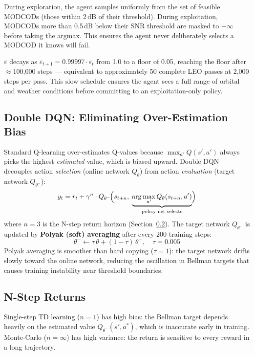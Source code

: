 \documentclass[12pt,a4paper]{report}
\begin{document}
During exploration, the agent samples uniformly from the set of feasible
MODCODs (those within 2\,dB of their threshold). During exploitation, MODCODs
more than 0.5\,dB below their SNR threshold are masked to $-\infty$ before
taking the argmax. This ensures the agent never deliberately selects a MODCOD
it knows will fail.

$\varepsilon$ decays as $\varepsilon_{t+1} = 0.99997\cdot\varepsilon_t$ from
1.0 to a floor of 0.05, reaching the floor after $\approx$100,000 steps
--- equivalent to approximately 50 complete LEO passes at 2,000 steps per pass.
This slow schedule ensures the agent sees a full range of orbital and weather
conditions before committing to an exploitation-only policy.

\subsection{Double DQN: Eliminating Over-Estimation Bias}

Standard Q-learning over-estimates Q-values because $\max_{a'} Q(s', a')$
always picks the highest \emph{estimated} value, which is biased upward.
Double DQN~\cite{vanhasselt2016} decouples action \emph{selection} (online
network $Q_\theta$) from action \emph{evaluation} (target network $Q_{\theta^-}$):
\begin{equation}
    y_t = r_t + \gamma^n \cdot Q_{\theta^-}\!\Bigl(s_{t+n},\;
    \underbrace{\arg\max_{a'} Q_\theta(s_{t+n}, a')}_{\text{policy net selects}}\Bigr)
\end{equation}
where $n = 3$ is the N-step return horizon (Section~\ref{sec:nstep}).
The target network $Q_{\theta^-}$ is updated by \textbf{Polyak (soft) averaging}
after every 200 training steps:
\begin{equation}
    \theta^- \leftarrow \tau\,\theta + (1-\tau)\,\theta^-, \quad \tau = 0.005
\end{equation}
Polyak averaging is smoother than hard copying ($\tau = 1$): the target
network drifts slowly toward the online network, reducing the oscillation
in Bellman targets that causes training instability near threshold boundaries.

\subsection{N-Step Returns}
\label{sec:nstep}

Single-step TD learning ($n = 1$) has high bias: the Bellman target
depends heavily on the estimated value $Q_{\theta^-}(s', a^*)$, which is
inaccurate early in training. Monte-Carlo ($n = \infty$) has high variance:
the return is sensitive to every reward in a long trajectory.
\end{document}
